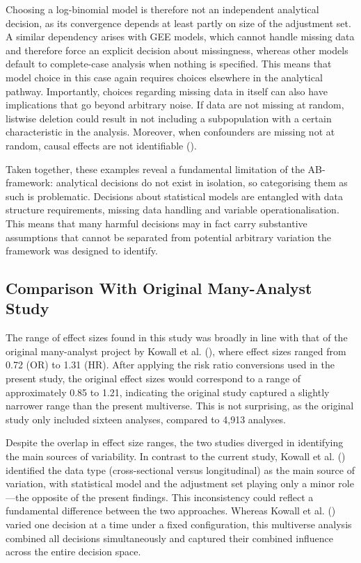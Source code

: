 \documentclass[
  man,
  floatsintext,
  longtable,
  nolmodern,
  notxfonts,
  notimes,
  colorlinks=true,linkcolor=blue,citecolor=blue,urlcolor=blue]{apa7}
\begin{document}
Choosing a log-binomial model is therefore not an independent analytical
decision, as its convergence depends at least partly on size of the
adjustment set. A similar dependency arises with GEE models, which
cannot handle missing data and therefore force an explicit decision
about missingness, whereas other models default to complete-case
analysis when nothing is specified. This means that model choice in this
case again requires choices elsewhere in the analytical pathway.
Importantly, choices regarding missing data in itself can also have
implications that go beyond arbitrary noise. If data are not missing at
random, listwise deletion could result in not including a subpopulation
with a certain characteristic in the analysis. Moreover, when
confounders are missing not at random, causal effects are not
identifiable ().

Taken together, these examples reveal a fundamental limitation of the
AB-framework: analytical decisions do not exist in isolation, so
categorising them as such is problematic. Decisions about statistical
models are entangled with data structure requirements, missing data
handling and variable operationalisation. This means that many harmful
decisions may in fact carry substantive assumptions that cannot be
separated from potential arbitrary variation the framework was designed
to identify.

\subsection{Comparison With Original Many-Analyst
Study}\label{comparison-with-original-many-analyst-study}

The range of effect sizes found in this study was broadly in line with
that of the original many-analyst project by Kowall et al.
(), where effect sizes ranged
from 0.72 (OR) to 1.31 (HR). After applying the risk ratio conversions
used in the present study, the original effect sizes would correspond to
a range of approximately 0.85 to 1.21, indicating the original study
captured a slightly narrower range than the present multiverse. This is
not surprising, as the original study only included sixteen analyses,
compared to 4,913 analyses.

Despite the overlap in effect size ranges, the two studies diverged in
identifying the main sources of variability. In contrast to the current
study, Kowall et al. ()
identified the data type (cross-sectional versus longitudinal) as the
main source of variation, with statistical model and the adjustment set
playing only a minor role---the opposite of the present findings. This
inconsistency could reflect a fundamental difference between the two
approaches. Whereas Kowall et al.
() varied one decision at a time
under a fixed configuration, this multiverse analysis combined all
decisions simultaneously and captured their combined influence across
the entire decision space.
\end{document}
